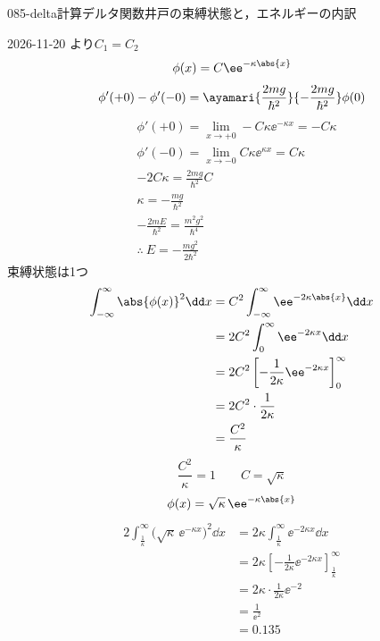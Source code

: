 \documentclass[uplatex,dvipdfmx,a4paper,11pt]{jsarticle}
\begin{document}
\begin{mondai}{085-delta}{計算}{デルタ関数井戸の束縛状態と，エネルギーの内訳}
\begin{kotaeutsushi}{2026-11-20}
 より\quad $C_{1}=C_{2}$
\[ \phi(x)=C\ee^{-\kappa\abs{x}} \]
\[ \phi'(+0)-\phi'(-0)=\ayamari{\frac{2mg}{\hbar^{2}}}{-\frac{2mg}{\hbar^{2}}}\phi(0) \]
\begin{align*}
&\phi'(+0)=\lim_{x\to+0}-C\kappa\ee^{-\kappa x}=-C\kappa\\
&\phi'(-0)=\lim_{x\to-0}C\kappa\ee^{\kappa x}=C\kappa\\
&-2C\kappa=\frac{2mg}{\hbar^{2}}C\\
&\kappa=-\frac{mg}{\hbar^{2}}\\
&-\frac{2mE}{\hbar^{2}}=\frac{m^{2}g^{2}}{\hbar^{4}}\\
&\therefore\ E=-\frac{mg^{2}}{2\hbar^{2}}
\end{align*}
束縛状態は1つ
\begin{align*}
\int_{-\infty}^{\infty}\abs{\phi(x)}^{2}\dd x&=C^{2}\int_{-\infty}^{\infty}\ee^{-2\kappa\abs{x}}\dd x\\
&=2C^{2}\int_{0}^{\infty}\ee^{-2\kappa x}\dd x\\
&=2C^{2}\left[-\frac{1}{2\kappa}\ee^{-2\kappa x}\right]_{0}^{\infty}\\
&=2C^{2}\cdot\frac{1}{2\kappa}\\
&=\frac{C^{2}}{\kappa}
\end{align*}
\[ \frac{C^{2}}{\kappa}=1\qquad C=\sqrt{\kappa} \]
\[ \phi(x)=\sqrt{\kappa}\,\ee^{-\kappa\abs{x}} \]
\begin{align*}
2\int_{\frac{1}{\kappa}}^{\infty}\bigl(\sqrt{\kappa}\,\ee^{-\kappa x}\bigr)^{2}\dd x&=2\kappa\int_{\frac{1}{\kappa}}^{\infty}\ee^{-2\kappa x}\dd x\\
&=2\kappa\left[-\frac{1}{2\kappa}\ee^{-2\kappa x}\right]_{\frac{1}{\kappa}}^{\infty}\\
&=2\kappa\cdot\frac{1}{2\kappa}\ee^{-2}\\
&=\frac{1}{\ee^{2}}\\
&=\num{0.135}
\end{align*}

\end{kotaeutsushi}
\end{mondai}
\end{document}
